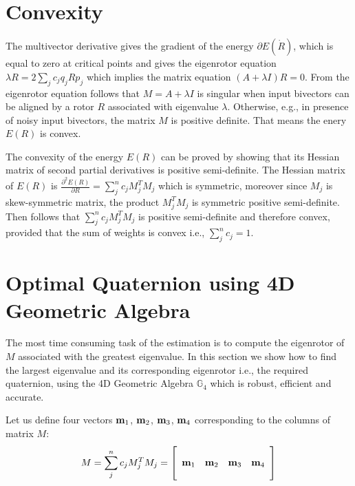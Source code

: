 \documentclass{birkjour}
\numberwithin{equation}{section}
\begin{document}
\section{Convexity}

The multivector derivative gives the gradient of the energy $\partial E(\dot R)$, which is equal to zero at critical points and gives the eigenrotor equation $\lambda R = 2 \sum_j { c_{j} q_j R p_j }$ which implies the matrix equation $(A  + \lambda I) R = 0$. From the eigenrotor equation follows that $M = A  + \lambda I$ is singular when input bivectors can be aligned by a rotor $R$ associated with eigenvalue $\lambda$. Otherwise, e.g., in presence of noisy input bivectors, the matrix $M$ is positive definite. That means the enery $E(R)$ is convex.

The convexity of the energy $E(R)$ can be proved by showing that its Hessian matrix of second partial derivatives is positive semi-definite. The Hessian matrix of $E(R)$ is $\frac{\partial^2 E(R)}{\partial R} = \sum_j^n { c_j M_j^T M_j}$ which is symmetric, moreover since $M_j$ is skew-symmetric matrix, the product $M_j^T M_j$ is symmetric positive semi-definite. Then follows that $\sum_j^n { c_j M_j^T M_j}$ is positive semi-definite and therefore convex, provided that the sum of weights is convex i.e., $\sum_j^n { c_j } = 1$.

\section{Optimal Quaternion using 4D Geometric Algebra}

The most time consuming task of the estimation is to compute the eigenrotor of $M$ associated with the greatest eigenvalue. In this section we show how to find the largest eigenvalue and its corresponding eigenrotor i.e., the required quaternion, using the 4D Geometric Algebra $ \mathbb{G}_4$ which is robust, efficient and accurate.

Let us define four vectors $\textbf m_1$, $\textbf m_2$, $\textbf m_3$, $\textbf m_4$ corresponding to the columns of matrix $M$:
\begin{eqnarray}
	M = \sum_j^n { c_j M_j^T M_j} =
	\left[\begin{array}{cccc}
		\\
		\textbf m_1 & \textbf m_2 & \textbf m_3 & \textbf m_4 \\
		\\
	\end{array}\right]
\end{eqnarray}
\end{document}
